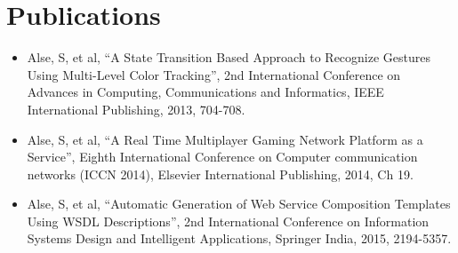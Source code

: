 \documentclass[a4paper,10pt]{article} %
\begin{document}
\section{Publications}

\begin{itemize}
\item Alse, S, et al, ``A State Transition Based Approach to Recognize Gestures Using Multi-Level Color Tracking'', 2nd International Conference on Advances in Computing, Communications and Informatics, IEEE International Publishing, 2013, 704-708.
\item Alse, S, et al, ``A Real Time Multiplayer Gaming Network Platform as a Service'', Eighth International Conference on Computer communication networks (ICCN 2014), Elsevier International Publishing, 2014, Ch 19.
\item Alse, S, et al, ``Automatic Generation of Web Service Composition Templates Using WSDL Descriptions'', 2nd International Conference on Information Systems Design and Intelligent Applications, Springer India, 2015, 2194-5357.
\end{itemize}
\end{document}
